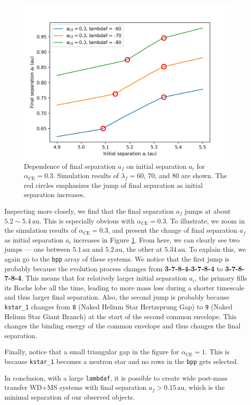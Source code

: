 \documentclass[12pt]{article}
\newcommand{\alphace}{\alpha_{\mathrm{CE}}}
\newcommand{\au}{\, \mathrm{au}}
\begin{document}
\begin{figure}
    \centering
    \includegraphics[width = 0.6\linewidth]{jump-zoom.png}
    \caption{Dependence of final separation $a_f$ on initial separation $a_i$ for $\alphace = 0.3$. Simulation results of $\lambda_f = 60$, $70$, and $80$ are shown. The red circles emphasizes the jump of final separation as initial separation increases.}
    \label{jump-zoom}
\end{figure}

Inspecting more closely, we find that the final separation $a_f$ jumps at about $5.2 \sim 5.4 \au$. This is especially obvious with $\alphace = 0.3$. To illustrate, we zoom in the simulation results of $\alphace = 0.3$, and present the change of final separation $a_f$ as initial separation $a_i$ increases in Figure \ref{jump-zoom}. From here, we can clearly see two jumps — one between $5.1\au$ and $5.2\au$, the other at $5.34\au$. To explain this, we again go to the \verb|bpp| array of these systems. We notice that the first jump is probably because the evolution process changes from \textbf{3-7-8-4-3-7-8-4} to \textbf{3-7-8-7-8-4}. This means that for relatively larger initial separation $a_i$, the primary fills its Roche lobe all the time, leading to more mass loss during a shorter timescale and thus larger final separation. Also, the second jump is probably because \verb|kstar_1| changes from \verb|8| (Naked Helium Star Hertzsprung Gap) to \verb|9| (Naked Helium Star Giant Branch) at the start of the second common envelope. This changes the binding energy of the common envelope and thus changes the final separation.

Finally, notice that a small triangular gap in the figure for $\alphace = 1$. This is because \verb|kstar_1| becomes a neutron star and no rows in the \verb|bpp| gets selected.

In conclusion, with a large \verb|lambdaf|, it is possible to create wide post-mass transfer WD+MS systems with final separation $a_f > 0.15 \au$, which is the minimal separation of our observed objects.
\end{document}
